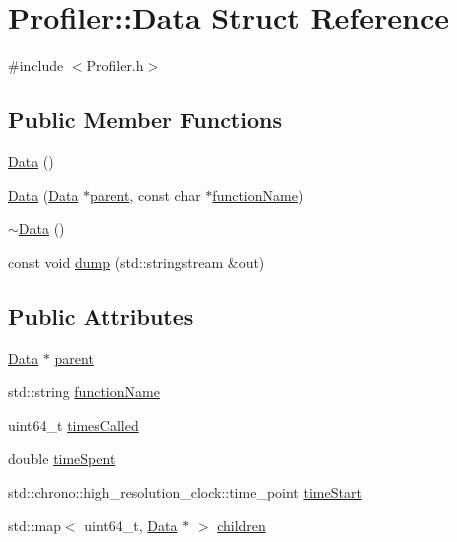 \hypertarget{struct_profiler_1_1_data}{}\section{Profiler\+:\+:Data Struct Reference}
\label{struct_profiler_1_1_data}


{\ttfamily \#include $<$Profiler.\+h$>$}

\subsection*{Public Member Functions}
\begin{DoxyCompactItemize}
\item 
\hyperlink{struct_profiler_1_1_data_a948384dc5a585b604993a336227946d3}{Data} ()
\item 
\hyperlink{struct_profiler_1_1_data_a67dd48e639f8837ce3837180997f1fb5}{Data} (\hyperlink{struct_profiler_1_1_data}{Data} $\ast$\hyperlink{struct_profiler_1_1_data_a03fc44b9847c501d013edd119e9e2883}{parent}, const char $\ast$\hyperlink{struct_profiler_1_1_data_a7ba86ce73c788e68ac563f5dd2b7cf0e}{function\+Name})
\item 
\hyperlink{struct_profiler_1_1_data_a37cc05a58760958fe799a8bca8557c3f}{$\sim$\+Data} ()
\item 
const void \hyperlink{struct_profiler_1_1_data_af9bd89654595106b06b37bdfb1fd918f}{dump} (std\+::stringstream \&out)
\end{DoxyCompactItemize}
\subsection*{Public Attributes}
\begin{DoxyCompactItemize}
\item 
\hyperlink{struct_profiler_1_1_data}{Data} $\ast$ \hyperlink{struct_profiler_1_1_data_a03fc44b9847c501d013edd119e9e2883}{parent}
\item 
std\+::string \hyperlink{struct_profiler_1_1_data_a7ba86ce73c788e68ac563f5dd2b7cf0e}{function\+Name}
\item 
uint64\+\_\+t \hyperlink{struct_profiler_1_1_data_a0b2089e9dd5738281e01baa681b4e542}{times\+Called}
\item 
double \hyperlink{struct_profiler_1_1_data_a19d4cb0603046e7463c6dee9db916194}{time\+Spent}
\item 
std\+::chrono\+::high\+\_\+resolution\+\_\+clock\+::time\+\_\+point \hyperlink{struct_profiler_1_1_data_afbbb2195e44ec620890e389db3963afc}{time\+Start}
\item 
std\+::map$<$ uint64\+\_\+t, \hyperlink{struct_profiler_1_1_data}{Data} $\ast$ $>$ \hyperlink{struct_profiler_1_1_data_a5ca61fdcbac716347974f8dd71f95625}{children}
\end{DoxyCompactItemize}


